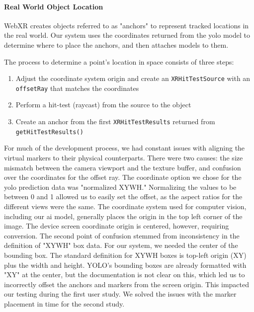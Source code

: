 \documentclass[thesis]{fputhesis}
\begin{document}
\begin{body}
\paragraph{Real World Object Location}
WebXR creates objects referred to as "anchors" to represent tracked locations in the real world. Our system uses the coordinates returned from the \acrshort{yolo} model to determine where to place the anchors, and then attaches models to them. 

The process to determine a point's location in space consists of three steps:
\begin{enumerate}
    \item Adjust the coordinate system origin and create an \verb|XRHitTestSource| with an \verb|offsetRay| that matches the coordinates
    \item Perform a hit-test (raycast) from the source to the object
    \item Create an anchor from the first \verb|XRHitTestResults| returned from  \verb|getHitTestResults()|
\end{enumerate}
For much of the development process, we had constant issues with aligning the virtual markers to their physical counterparts. There were two causes: the size mismatch between the camera viewport and the texture buffer, and confusion over the coordinates for the offset ray. The coordinate option we chose for the \acrshort{yolo} prediction data was "normalized XYWH." Normalizing the values to be between 0 and 1 allowed us to easily set the offset, as the aspect ratios for the different views were the same. The coordinate system used for computer vision, including our \acrshort{ai} model, generally places the origin in the top left corner of the image. The device screen coordinate origin is centered, however, requiring conversion. The second point of confusion stemmed from inconsistency in the definition of "XYWH" box data. For our system, we needed the center of the bounding box. The standard definition for XYWH boxes is top-left origin (XY) plus the width and height. YOLO's bounding boxes are already formatted with "XY" at the center, but the documentation is not clear on this, which led us to incorrectly offset the anchors and markers from the screen origin. This impacted our testing during the first user study.  We solved the issues with the marker placement in time for the second study.
\filbreak

\end{body}
\end{document}

